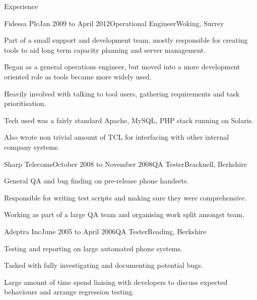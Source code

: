 \documentclass{resume} %
\begin{document}
\begin{rSection}{Experience}
  \begin{rExperience}{Fidessa Plc}{Jan 2009 to April 2012}{Operational Engineer}{Woking, Surrey}
  \item Part of a small support and development team, mostly responsible for creating tools to aid long term capacity planning and server management.
  \item Began as a general operations engineer, but moved into a more development oriented role as tools became more widely used.
  \item Heavily involved with talking to tool users, gathering requirements and task prioritisation.
  \item Tech used was a fairly standard Apache, MySQL, PHP stack running on Solaris.
  \item Also wrote non trivial amount of TCL for interfacing with other internal company systems.
  \end{rExperience}


  \begin{rExperience}{Sharp Telecoms}{October 2008 to November 2008}{QA Tester}{Bracknell, Berkshire}
  \item General QA and bug finding on pre-release phone handsets.
  \item Responsible for writing test scripts and making sure they were comprehensive.
  \item Working as part of a large QA team and organising work split amongst team.
  \end{rExperience}


  \begin{rExperience}{Adeptra Inc}{June 2005 to April 2006}{QA Tester}{Reading, Berkshire}
  \item Testing and reporting on large automated phone systems.
  \item Tasked with fully investigating and documenting potential bugs.
  \item Large amount of time spend liaising with developers to discuss expected behaviours and arrange regression testing.
  \end{rExperience}

\end{rSection}

\pagebreak

\end{document}

